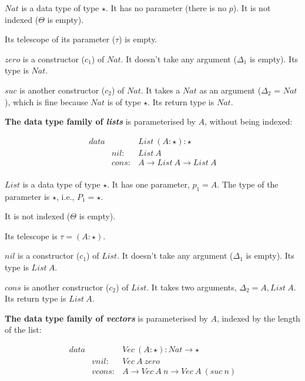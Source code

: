 $Nat$ is a data type of type $\star$. It has no parameter (there is no $p$). It is not indexed ($\Theta$ is empty).

Its telescope of its parameter ($\tau$) is empty.

$zero$ is a constructor ($c_1$) of $Nat$. It doesn't take any argument ($\Delta_1$ is empty). Its type is $Nat$.

$suc$ is another constructor ($c_2$) of $Nat$. It takes a $Nat$ as an argument ($\Delta_2$ = $Nat$), which is fine because $Nat$ is of type $\star$. Its return type is $Nat$.

\textbf{The data type family of \emph{lists}} is parameterised by $A$, without being indexed:

\begin{equation*}
  \begin{aligned}
    data &       & List \: (A:\star) : \star     \\
         & nil:  & List \: A                     \\
         & cons: & A \to List \: A \to List \: A \\
  \end{aligned}
\end{equation*}

$List$ is a data type of type $\star$. It has one parameter, $p_1 = A$. The type of the parameter is $\star$, i.e., $P_1 = \star$.

It is not indexed ($\Theta$ is empty).

Its telescope is $\tau = (A:\star)$.

$nil$ is a constructor ($c_1$) of $List$. It doesn't take any argument ($\Delta_1$ is empty). Its type is $List \: A$.

$cons$ is another constructor ($c_2$) of $List$. It takes two arguments, $\Delta_2 = A, List \: A$. Its return type is $List \: A$.

\textbf{The data type family of \emph{vectors}} is parameterised by $A$, indexed by the length of the list:

\begin{equation*}
  \begin{aligned}
    data &        & Vec \: (A:\star) : Nat \to \star               \\
         & vnil:  & Vec \: A \: zero                               \\
         & vcons: & A \to Vec \: A \: n \to Vec \: A \: (suc \: n) \\
  \end{aligned}
\end{equation*}

